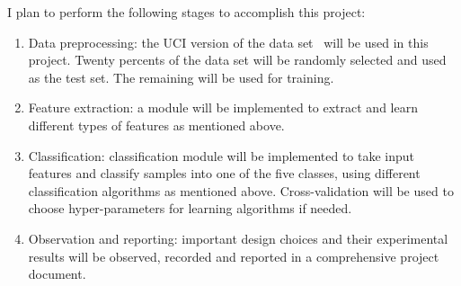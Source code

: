 \documentclass[12pt]{article}
\begin{document}
I plan to perform the following stages to accomplish this project:
\begin{enumerate}
\item Data preprocessing: the UCI version of the data set~\cite{UCISeizure} will be used in this project. Twenty percents of the data set will be randomly selected and used as the test set. The remaining will be used for training.
\item Feature extraction: a module will be implemented to extract and learn different types of features as mentioned above.
\item Classification: classification module will be implemented to take input features and classify samples into one of the five classes, using different classification algorithms as mentioned above. Cross-validation will be used to choose hyper-parameters for learning algorithms if needed.
\item Observation and reporting: important design choices and their experimental results will be observed, recorded and reported in a comprehensive project document.
\end{enumerate}



\end{document}
